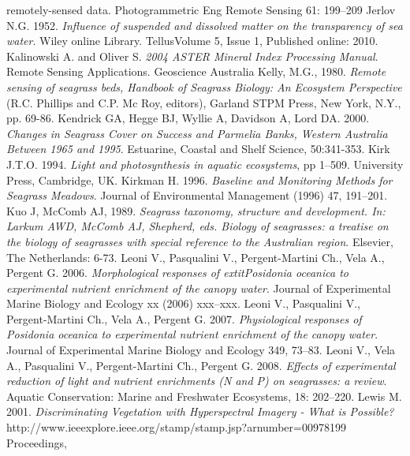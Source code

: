 \documentclass[10pt, a4paper]{article}
\begin{document}
\begin{thebibliography}{999}
{remotely-sensed data}. Photogrammetric Eng Remote Sensing 61: 199–209 \pageref{Jensen95}
Jerlov N.G. 1952. \emph{Influence of suspended and dissolved matter on the transparency of
sea water}. Wiley online Library. TellusVolume 5, Issue 1, Published online: 2010. \pageref{Jerlov52}
Kalinowski A. and Oliver S. \emph{2004 ASTER Mineral Index Processing Manual}. Remote
Sensing Applications. Geoscience Australia \pageref{Kalinowski04}
Kelly, M.G., 1980. \emph{Remote sensing of seagrass beds, Handbook of Seagrass Biology: An
Ecosystem Perspective} (R.C. Phillips and C.P. Mc Roy, editors), Garland STPM Press, New
York, N.Y., pp. 69-86. \pageref{Kelly80}
Kendrick GA, Hegge BJ, Wyllie A, Davidson A, Lord DA. 2000. \emph{Changes in Seagrass
Cover on Success and Parmelia Banks, Western Australia Between 1965 and 1995}.
Estuarine, Coastal and Shelf Science, 50:341-353. \pageref{Kendrick00}
Kirk J.T.O. 1994. \emph{Light and photosynthesis in aquatic ecosystems}, pp 1–509. University
Press, Cambridge, UK. \pageref{Kirk94}
Kirkman H. 1996. \emph{Baseline and Monitoring Methods for Seagrass Meadows}. Journal of
Environmental Management (1996) 47, 191–201. \pageref{Kirkman96}
Kuo J, McComb AJ, 1989. \emph{Seagrass taxonomy, structure and development. In: Larkum
AWD, McComb AJ, Shepherd, eds. Biology of seagrasses: a treatise on the biology of
seagrasses with special reference to the Australian region}. Elsevier, The Netherlands: 6-73. \pageref{Kuo89}
Leoni V., Pasqualini V., Pergent-Martini Ch., Vela A., Pergent G. 2006. \emph{Morphological
responses of \textit{	extit{Posidonia oceanica}} to experimental nutrient enrichment of the canopy water}.
Journal of Experimental Marine Biology and Ecology xx (2006) xxx–xxx. \pageref{Leoni06}
Leoni V., Pasqualini V., Pergent-Martini Ch., Vela A., Pergent G. 2007. \emph{Physiological
responses of \textit{{Posidonia oceanica}} to experimental nutrient enrichment of the canopy water}.
Journal of Experimental Marine Biology and Ecology 349, 73–83. \pageref{Leoni07}
Leoni V., Vela A., Pasqualini V., Pergent-Martini Ch., Pergent G. 2008. \emph{Effects of
experimental reduction of light and nutrient enrichments (N and P) on seagrasses: a review}.
Aquatic Conservation: Marine and Freshwater Ecosystems, 18: 202–220. \pageref{Leoni08}
Lewis M. 2001. \emph{Discriminating Vegetation with Hyperspectral Imagery - What is
Possible?} http://www.ieeexplore.ieee.org/stamp/stamp.jsp?arnumber=00978199 Proceedings,

\end{thebibliography}
\end{document}
